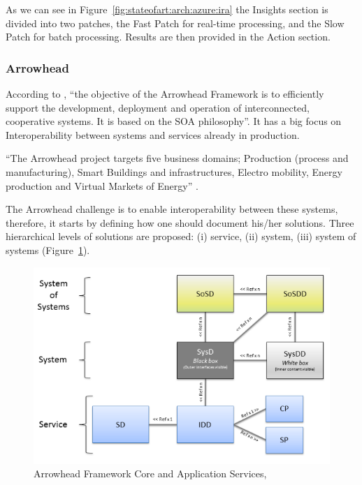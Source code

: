 As we can see in Figure~\ref{fig:stateofart:arch:azure:ira} the Insights section is divided into two patches, the Fast Patch for real-time processing, and the Slow Patch for batch processing. Results are then provided in the Action section.

\subsubsection{Arrowhead}
\label{subsubsec:stateofart:arch:arrrowhead}

According to \cite{varga2017making}, ``the objective of the Arrowhead Framework is to efficiently support the development, deployment and operation of interconnected, cooperative systems. It is based on the \gls{SOA} philosophy''. It has a big focus on Interoperability between systems and services already in production.

``The Arrowhead project targets five business domains; Production (process and manufacturing), Smart Buildings and infrastructures, Electro mobility, Energy production and Virtual Markets of Energy'' \parencite{blomstedt2014arrowhead}.

The Arrowhead challenge is to enable interoperability between these systems, therefore, it starts by defining how one should document his/her solutions. Three hierarchical levels of solutions are proposed: (i) service, (ii) system, (iii) system of systems (Figure~\ref{fig:stateofart:arch:arrowhead:levels}).

\begin{figure}[H]
    \centering
    \includegraphics[scale=0.6]{
        assets/figures/arrowhead-levels.png
    }
    \caption[Arrowhead Framework Core and Application Services]{Arrowhead Framework Core and Application Services, \cite{blomstedt2014arrowhead}}
    \label{fig:stateofart:arch:arrowhead:levels}
\end{figure}

